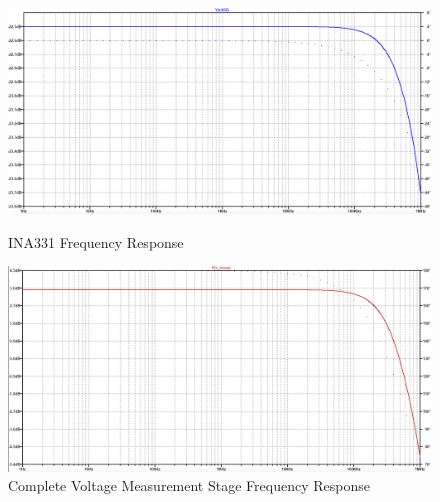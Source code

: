 \begin{figure}[H]
    \centering
    \begin{minipage}{0.48\textwidth}
        \centering
        \includegraphics[width=\textwidth]{INA331FreqResponse.png}
        \caption{INA331 Frequency Response}
        \label{fig:ina_freq}
    \end{minipage}\hfill
    \begin{minipage}{0.48\textwidth}
        \centering
        \includegraphics[width=\textwidth]{VmeasFreqResponse.png}
        \caption{Complete Voltage Measurement Stage Frequency Response}
        \label{fig:v_meas_freq}
    \end{minipage}
\end{figure}

